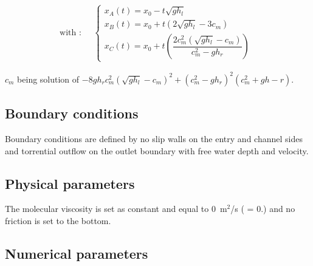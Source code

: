 \begin{equation}
\text{with :} \quad \begin{split}\begin{cases}
x_A(t) = x_0 - t \sqrt{g h_l} \\
x_B(t) = x_0 + t \left( 2 \sqrt{gh_l} - 3c_m \right) \\
x_C(t) = x_0 + t \left( \dfrac{2c_m^2 \left( \sqrt{gh_l} - c_m \right)}{c_m^2-g h_r} \right)
\end{cases}\end{split}
\end{equation}

$c_m$ being solution of $-8g h_r c_m^2 (\sqrt{gh_l}-c_m)^2+(c_m^2-gh_r)^2(c_m^2+gh-r)$.

\subsection{Boundary conditions}
Boundary conditions are defined by no slip walls on the entry and channel sides
and torrential outflow on the outlet boundary with free water depth and velocity.

\subsection{Physical parameters}

The molecular viscosity is set as constant and equal to 0~m$^2$/s
( = 0.) and no friction is set to the bottom.

\subsection{Numerical parameters}

